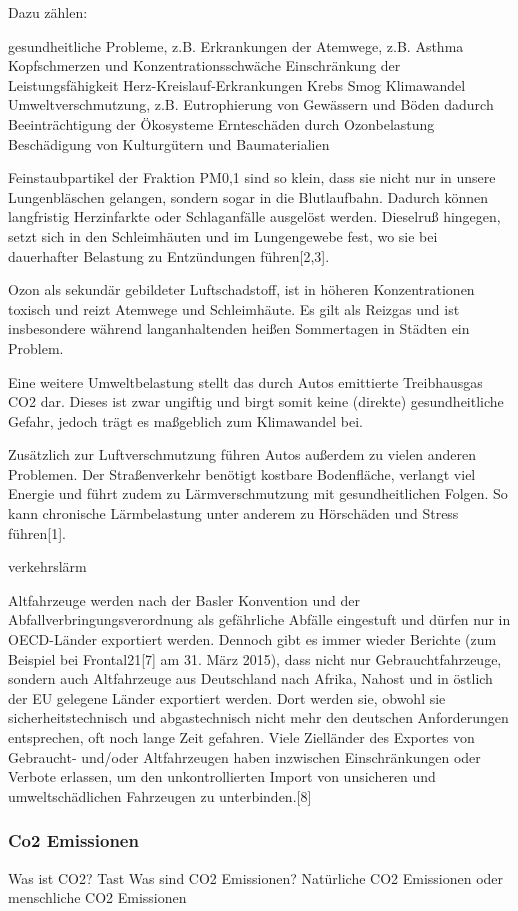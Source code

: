 Dazu zählen:

gesundheitliche Probleme, z.B.
Erkrankungen der Atemwege, z.B. Asthma
Kopfschmerzen und Konzentrationsschwäche
Einschränkung der Leistungsfähigkeit
Herz-Kreislauf-Erkrankungen
Krebs
Smog
Klimawandel
Umweltverschmutzung, z.B. Eutrophierung von Gewässern und Böden
dadurch Beeinträchtigung der Ökosysteme
Ernteschäden durch Ozonbelastung
Beschädigung von Kulturgütern und Baumaterialien


Feinstaubpartikel der Fraktion PM0,1 sind so klein, dass sie nicht nur in unsere Lungenbläschen gelangen, sondern sogar in die Blutlaufbahn. Dadurch können langfristig Herzinfarkte oder Schlaganfälle ausgelöst werden. Dieselruß hingegen, setzt sich in den Schleimhäuten und im Lungengewebe fest, wo sie bei dauerhafter Belastung zu Entzündungen führen[2,3].

Ozon als sekundär gebildeter Luftschadstoff, ist in höheren Konzentrationen toxisch und reizt Atemwege und Schleimhäute. Es gilt als Reizgas und ist insbesondere während langanhaltenden heißen Sommertagen in Städten ein Problem.



Eine weitere Umweltbelastung stellt das durch Autos emittierte Treibhausgas CO2 dar. Dieses ist zwar ungiftig und birgt somit keine (direkte) gesundheitliche Gefahr, jedoch trägt es maßgeblich zum Klimawandel bei.

Zusätzlich zur Luftverschmutzung führen Autos außerdem zu vielen anderen Problemen. Der Straßenverkehr benötigt kostbare Bodenfläche, verlangt viel Energie und führt zudem zu Lärmverschmutzung mit gesundheitlichen Folgen. So kann chronische Lärmbelastung unter anderem zu Hörschäden und Stress führen[1].

verkehrslärm


Altfahrzeuge werden nach der Basler Konvention und der Abfallverbringungsverordnung als gefährliche Abfälle eingestuft und dürfen nur in OECD-Länder exportiert werden. Dennoch gibt es immer wieder Berichte (zum Beispiel bei Frontal21[7] am 31. März 2015), dass nicht nur Gebrauchtfahrzeuge, sondern auch Altfahrzeuge aus Deutschland nach Afrika, Nahost und in östlich der EU gelegene Länder exportiert werden. Dort werden sie, obwohl sie sicherheitstechnisch und abgastechnisch nicht mehr den deutschen Anforderungen entsprechen, oft noch lange Zeit gefahren. Viele Zielländer des Exportes von Gebraucht- und/oder Altfahrzeugen haben inzwischen Einschränkungen oder Verbote erlassen, um den unkontrollierten Import von unsicheren und umweltschädlichen Fahrzeugen zu unterbinden.[8]

\subsubsection{Co2 Emissionen}
Was ist \ac{CO2}? Tast
Was sind \ac{CO2} Emissionen?
Natürliche \ac{CO2} Emissionen oder menschliche CO2 Emissionen
